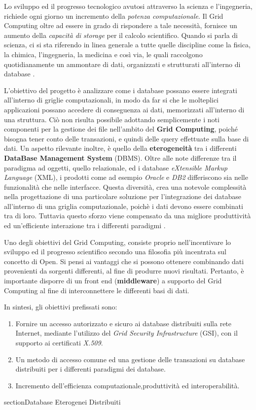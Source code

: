 \documentclass[11pt]{article}
\begin{document}
Lo sviluppo ed il progresso tecnologico avutosi attraverso la scienza e l'ingegneria, richiede ogni giorno un incremento della \emph{potenza computazionale}. Il Grid Computing oltre ad essere in grado di rispondere a tale necessità, fornisce un aumento della \emph{capacità di storage} per il calcolo scientifico.
Quando si parla di scienza, ci si sta riferendo in linea generale a tutte quelle discipline come la fisica, la chimica, l'ingegneria, la medicina e così via, le quali raccolgono quotidianamente un ammontare di dati, organizzati e strutturati all'interno di database \cite{2} \cite{3}.

L'obiettivo del progetto è analizzare come i database possano essere integrati all'interno di griglie computazionali, in modo da far si che le molteplici applicazioni possano accedere di conseguenza ai dati, memorizzati all'interno di una struttura. Ciò non risulta possibile adottando semplicemente i noti componenti per la gestione dei file nell'ambito del \textbf{Grid Computing}, poiché bisogna tener conto delle transazioni, e quindi delle query effettuate sulla base di dati. Un aspetto rilevante inoltre, è quello della \textbf{eterogeneità} tra i differenti \textbf{DataBase Management System} (DBMS). Oltre alle note differenze tra il paradigma ad oggetti, quello relazionale, ed i database \emph{eXtensible Markup Language} (XML), i prodotti come ad esempio \emph{Oracle} e \emph{DB2} differiscono sia nelle funzionalità che nelle interfacce. Questa diversità, crea una notevole complessità nella progettazione di una particolare soluzione per l'integrazione dei database all'interno di una griglia computazionale, poichè i dati devono essere combinati tra di loro. Tuttavia questo sforzo viene compensato da una migliore produttività ed un'efficiente interazione tra i differenti paradigmi \cite{2} \cite{3}.

Uno degli obiettivi del Grid Computing, consiste proprio nell'incentivare lo sviluppo ed il progresso scientifico secondo una filosofia più incentrata sul concetto di Open. Si pensi ai vantaggi che si possono ottenere combinando dati provenienti da sorgenti differenti, al fine di produrre nuovi risultati.
Pertanto, è importante disporre di un front end (\textbf{middleware}) a supporto del Grid Computing al fine di interconnettere le differenti basi di dati.

In sintesi, gli obiettivi prefissati sono:
\begin{enumerate}
\item Fornire un accesso autorizzato e sicuro ai database distribuiti sulla rete Internet, mediante l'utilizzo del \emph{Grid Security Infrastructure} (GSI), con il supporto  ai certificati \emph{X.509}.
\item Un metodo di accesso comune ed una gestione delle transazioni su database distribuiti per i differenti paradigmi dei database.
\item Incremento dell'efficienza computazionale,produttività ed interoperabilità.
\end{enumerate}
section{Database Eterogenei Distribuiti}
\end{document}
